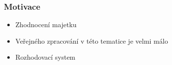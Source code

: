 




\begin{frame}
    \frametitle{Motivace}
    \begin{itemize}
        \itemsep1em
        \item Zhodnocení majetku
        \item Veřejného zpracování v této tematice je velmi málo
        \item Rozhodovací system
    \end{itemize}
\end{frame}

